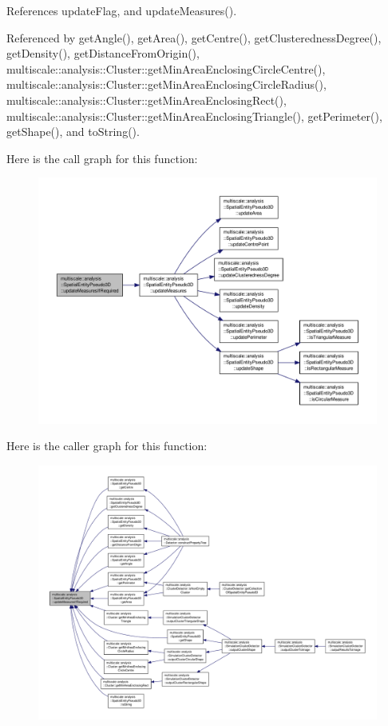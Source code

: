 References update\-Flag, and update\-Measures().



Referenced by get\-Angle(), get\-Area(), get\-Centre(), get\-Clusteredness\-Degree(), get\-Density(), get\-Distance\-From\-Origin(), multiscale\-::analysis\-::\-Cluster\-::get\-Min\-Area\-Enclosing\-Circle\-Centre(), multiscale\-::analysis\-::\-Cluster\-::get\-Min\-Area\-Enclosing\-Circle\-Radius(), multiscale\-::analysis\-::\-Cluster\-::get\-Min\-Area\-Enclosing\-Rect(), multiscale\-::analysis\-::\-Cluster\-::get\-Min\-Area\-Enclosing\-Triangle(), get\-Perimeter(), get\-Shape(), and to\-String().



Here is the call graph for this function\-:
\nopagebreak
\begin{figure}[H]
\begin{center}
\leavevmode
\includegraphics[width=350pt]{classmultiscale_1_1analysis_1_1SpatialEntityPseudo3D_a151cd8c0fdfbc98cfd0adc99b9943369_cgraph}
\end{center}
\end{figure}




Here is the caller graph for this function\-:
\nopagebreak
\begin{figure}[H]
\begin{center}
\leavevmode
\includegraphics[width=350pt]{classmultiscale_1_1analysis_1_1SpatialEntityPseudo3D_a151cd8c0fdfbc98cfd0adc99b9943369_icgraph}
\end{center}
\end{figure}


